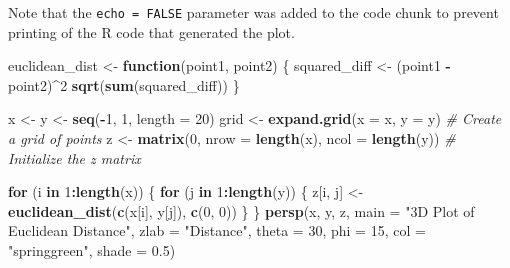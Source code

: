 \documentclass[
]{article}
\newenvironment{Shaded}{\begin{snugshade}}{\end{snugshade}}
\newcommand{\AttributeTok}[1]{\textcolor[rgb]{0.13,0.29,0.53}{#1}}
\newcommand{\CommentTok}[1]{\textcolor[rgb]{0.56,0.35,0.01}{\textit{#1}}}
\newcommand{\ControlFlowTok}[1]{\textcolor[rgb]{0.13,0.29,0.53}{\textbf{#1}}}
\newcommand{\DecValTok}[1]{\textcolor[rgb]{0.00,0.00,0.81}{#1}}
\newcommand{\FloatTok}[1]{\textcolor[rgb]{0.00,0.00,0.81}{#1}}
\newcommand{\FunctionTok}[1]{\textcolor[rgb]{0.13,0.29,0.53}{\textbf{#1}}}
\newcommand{\NormalTok}[1]{#1}
\newcommand{\OtherTok}[1]{\textcolor[rgb]{0.56,0.35,0.01}{#1}}
\newcommand{\SpecialCharTok}[1]{\textcolor[rgb]{0.81,0.36,0.00}{\textbf{#1}}}
\newcommand{\StringTok}[1]{\textcolor[rgb]{0.31,0.60,0.02}{#1}}
\begin{document}
Note that the \texttt{echo\ =\ FALSE} parameter was added to the code
chunk to prevent printing of the R code that generated the plot.

\begin{Shaded}
\begin{Highlighting}[]
\NormalTok{euclidean\_dist }\OtherTok{\textless{}{-}} \ControlFlowTok{function}\NormalTok{(point1, point2) \{}
\NormalTok{  squared\_diff }\OtherTok{\textless{}{-}}\NormalTok{ (point1 }\SpecialCharTok{{-}}\NormalTok{ point2)}\SpecialCharTok{\^{}}\DecValTok{2}
  \FunctionTok{sqrt}\NormalTok{(}\FunctionTok{sum}\NormalTok{(squared\_diff))}
\NormalTok{\}}

\NormalTok{x }\OtherTok{\textless{}{-}}\NormalTok{ y }\OtherTok{\textless{}{-}} \FunctionTok{seq}\NormalTok{(}\SpecialCharTok{{-}}\DecValTok{1}\NormalTok{, }\DecValTok{1}\NormalTok{, }\AttributeTok{length =} \DecValTok{20}\NormalTok{)}
\NormalTok{grid }\OtherTok{\textless{}{-}} \FunctionTok{expand.grid}\NormalTok{(}\AttributeTok{x =}\NormalTok{ x, }\AttributeTok{y =}\NormalTok{ y)  }\CommentTok{\# Create a grid of points}
\NormalTok{z }\OtherTok{\textless{}{-}} \FunctionTok{matrix}\NormalTok{(}\DecValTok{0}\NormalTok{, }\AttributeTok{nrow =} \FunctionTok{length}\NormalTok{(x), }\AttributeTok{ncol =} \FunctionTok{length}\NormalTok{(y))  }\CommentTok{\# Initialize the z matrix}

\ControlFlowTok{for}\NormalTok{ (i }\ControlFlowTok{in} \DecValTok{1}\SpecialCharTok{:}\FunctionTok{length}\NormalTok{(x)) \{}
  \ControlFlowTok{for}\NormalTok{ (j }\ControlFlowTok{in} \DecValTok{1}\SpecialCharTok{:}\FunctionTok{length}\NormalTok{(y)) \{}
\NormalTok{    z[i, j] }\OtherTok{\textless{}{-}} \FunctionTok{euclidean\_dist}\NormalTok{(}\FunctionTok{c}\NormalTok{(x[i], y[j]), }\FunctionTok{c}\NormalTok{(}\DecValTok{0}\NormalTok{, }\DecValTok{0}\NormalTok{))}
\NormalTok{  \}}
\NormalTok{\}}
\FunctionTok{persp}\NormalTok{(x, y, z,}
      \AttributeTok{main =} \StringTok{"3D Plot of Euclidean Distance"}\NormalTok{,}
      \AttributeTok{zlab =} \StringTok{"Distance"}\NormalTok{,}
      \AttributeTok{theta =} \DecValTok{30}\NormalTok{, }\AttributeTok{phi =} \DecValTok{15}\NormalTok{,}
      \AttributeTok{col =} \StringTok{"springgreen"}\NormalTok{, }\AttributeTok{shade =} \FloatTok{0.5}\NormalTok{)}
\end{Highlighting}
\end{Shaded}
\end{document}
